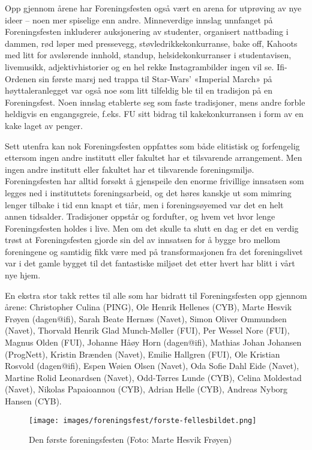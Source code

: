 Opp gjennom årene har Foreningsfesten også vært en arena for utprøving av nye ideer – noen mer spiselige enn andre. Minneverdige innslag unnfanget på Foreningsfesten inkluderer auksjonering av studenter, organisert nattbading i dammen, rød løper med pressevegg, støvledrikkekonkurranse, bake off, Kahoots med litt for avslørende innhold, standup, helsidekonkurranser i studentavisen, livemusikk, adjektivhistorier og en hel rekke Instagrambilder ingen vil se. Ifi-Ordenen sin første marsj ned trappa til Star-Wars' «Imperial March» på høyttaleranlegget var også noe som litt tilfeldig ble til en tradisjon på en Foreningsfest. Noen innslag etablerte seg som faste tradisjoner, mens andre forble heldigvis en engangsgreie, f.eks. FU sitt bidrag til kakekonkurransen i form av en kake laget av penger.

Sett utenfra kan nok Foreningsfesten oppfattes som både elitistisk og forfengelig ettersom ingen andre institutt eller fakultet har et tilsvarende arrangement. Men ingen andre institutt eller fakultet har et tilsvarende foreningsmiljø. Foreningsfesten har alltid forsøkt å gjenspeile den enorme frivillige innsatsen som legges ned i instituttets foreningsarbeid, og det høres kanskje ut som mimring lenger tilbake i tid enn knapt et tiår, men i foreningsøyemed var det en helt annen tidsalder. Tradisjoner oppstår og fordufter, og hvem vet hvor lenge Foreningsfesten holdes i live. Men om det skulle ta slutt en dag er det en verdig trøst at Foreningsfesten gjorde sin del av innsatsen for å bygge bro mellom foreningene og samtidig fikk være med på transformasjonen fra det foreningslivet var i det gamle bygget til det fantastiske miljøet det etter hvert har blitt i vårt nye hjem. 

En ekstra stor takk rettes til alle som har bidratt til Foreningsfesten opp gjennom årene: Christopher Culina (PING), Ole Henrik Hellenes (CYB), Marte Hesvik Frøyen (dagen@ifi), Sarah Beate Hernæs (Navet), Simon Oliver Ommundsen (Navet), Thorvald Henrik Glad Munch-Møller (FUI), Per Wessel Nore (FUI), Magnus Olden (FUI), Johanne Håøy Horn (dagen@ifi), Mathias Johan Johansen (ProgNett), Kristin Brænden (Navet), Emilie Hallgren (FUI), Ole Kristian Rosvold (dagen@ifi), Espen Wøien Olsen (Navet), Oda Sofie Dahl Eide (Navet), Martine Rolid Leonardsen (Navet), Odd-Tørres Lunde (CYB), Celina Moldestad (Navet), Nikolas Papaioannou (CYB), Adrian Helle (CYB), Andreas Nyborg Hansen (CYB).

\begin{figure}
	\texttt{[image: images/foreningsfest/forste-fellesbildet.png]}
	\label{fig:forste-fellesbilde}
	\caption{Den første foreningsfesten (Foto: Marte Hesvik Frøyen)}
\end{figure}
